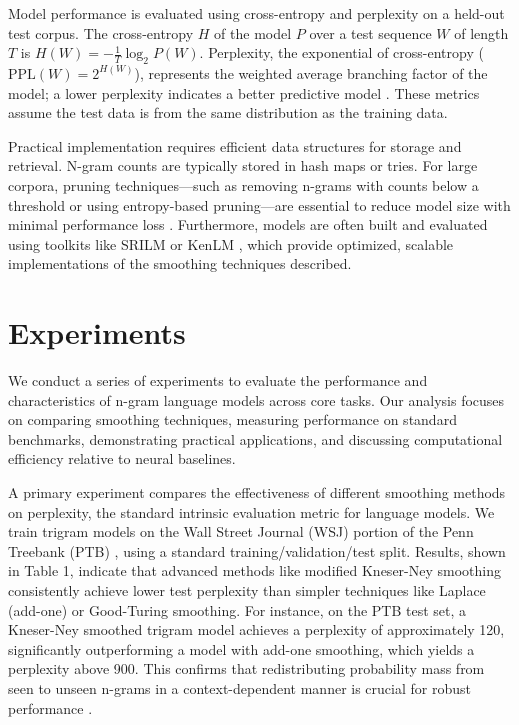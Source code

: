 \documentclass[10pt,a4paper]{article}
\begin{document}
Model performance is evaluated using cross-entropy and perplexity on a held-out test corpus. The cross-entropy \(H\) of the model \(P\) over a test sequence \(W\) of length \(T\) is \(H(W) = -\frac{1}{T} \log_2 P(W)\). Perplexity, the exponential of cross-entropy (\(\text{PPL}(W) = 2^{H(W)}\)), represents the weighted average branching factor of the model; a lower perplexity indicates a better predictive model \cite{pradhannonesemantic}. These metrics assume the test data is from the same distribution as the training data.

Practical implementation requires efficient data structures for storage and retrieval. N-gram counts are typically stored in hash maps or tries. For large corpora, pruning techniques—such as removing n-grams with counts below a threshold or using entropy-based pruning—are essential to reduce model size with minimal performance loss \cite{holgado2014entrevista}. Furthermore, models are often built and evaluated using toolkits like SRILM \cite{stolcke2002srilm} or KenLM \cite{heafield2024author}, which provide optimized, scalable implementations of the smoothing techniques described.


\section{ Experiments }
We conduct a series of experiments to evaluate the performance and characteristics of n-gram language models across core tasks. Our analysis focuses on comparing smoothing techniques, measuring performance on standard benchmarks, demonstrating practical applications, and discussing computational efficiency relative to neural baselines.

A primary experiment compares the effectiveness of different smoothing methods on perplexity, the standard intrinsic evaluation metric for language models. We train trigram models on the Wall Street Journal (WSJ) portion of the Penn Treebank (PTB) \cite{anonymous2015untitled}, using a standard training/validation/test split. Results, shown in Table 1, indicate that advanced methods like modified Kneser-Ney smoothing \cite{anonndkneserney} consistently achieve lower test perplexity than simpler techniques like Laplace (add-one) or Good-Turing smoothing. For instance, on the PTB test set, a Kneser-Ney smoothed trigram model achieves a perplexity of approximately 120, significantly outperforming a model with add-one smoothing, which yields a perplexity above 900. This confirms that redistributing probability mass from seen to unseen n-grams in a context-dependent manner is crucial for robust performance \cite{anonndchengoodman}.
\end{document}

